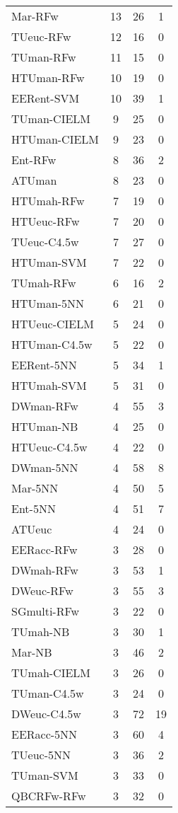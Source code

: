 \begin{table}[h]
\begin{center}
{\begin{tabular}{lccc}
Mar-RFw    & 13 & 26 & 1 \\
TUeuc-RFw  & 12 & 16 & 0 \\
TUman-RFw  & 11 & 15 & 0 \\
HTUman-RFw & 10 & 19 & 0 \\
EERent-SVM & 10 & 39 & 1 \\
TUman-CIELM & 9 & 25 & 0 \\
HTUman-CIELM & 9 & 23 & 0 \\
Ent-RFw    & 8 & 36 & 2 \\
ATUman     & 8 & 23 & 0 \\
HTUmah-RFw & 7 & 19 & 0 \\
HTUeuc-RFw & 7 & 20 & 0 \\
TUeuc-C4.5w & 7 & 27 & 0 \\
HTUman-SVM & 7 & 22 & 0 \\
TUmah-RFw  & 6 & 16 & 2 \\
HTUman-5NN & 6 & 21 & 0 \\
HTUeuc-CIELM & 5 & 24 & 0 \\
HTUman-C4.5w & 5 & 22 & 0 \\
EERent-5NN & 5 & 34 & 1 \\
HTUmah-SVM & 5 & 31 & 0 \\
DWman-RFw  & 4 & 55 & 3 \\
HTUman-NB  & 4 & 25 & 0 \\
HTUeuc-C4.5w & 4 & 22 & 0 \\
DWman-5NN  & 4 & 58 & 8 \\
Mar-5NN    & 4 & 50 & 5 \\
Ent-5NN    & 4 & 51 & 7 \\
ATUeuc     & 4 & 24 & 0 \\
EERacc-RFw & 3 & 28 & 0 \\
DWmah-RFw  & 3 & 53 & 1 \\
DWeuc-RFw  & 3 & 55 & 3 \\
SGmulti-RFw & 3 & 22 & 0 \\
TUmah-NB   & 3 & 30 & 1 \\
Mar-NB     & 3 & 46 & 2 \\
TUmah-CIELM & 3 & 26 & 0 \\
TUman-C4.5w & 3 & 24 & 0 \\
DWeuc-C4.5w & 3 & 72 & 19 \\
EERacc-5NN & 3 & 60 & 4 \\
TUeuc-5NN  & 3 & 36 & 2 \\
TUman-SVM  & 3 & 33 & 0 \\
QBCRFw-RFw & 3 & 32 & 0 \\

\end{tabular}}
\end{center}
\end{table}
